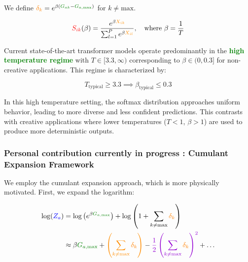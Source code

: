 \documentclass[a4paper]{article}
\theoremstyle{plain}
\theoremstyle{definition}
\theoremstyle{remark}
\begin{document}
We define $\textcolor{orange}{\delta_k} = e^{\beta (\textcolor{greencolor}{G_{ak}} - \textcolor{greencolor}{G_{a, \text{max}}})}$ for $k \neq \text{max}$.

\begin{equation}
\textcolor{red}{S_{ik}}(\beta) = \frac{e^{\beta \textcolor{insightcolor}{X_{ik}}}}{\sum_{l=1}^{P} e^{\beta \textcolor{insightcolor}{X_{il}}}}, \quad \text{where } \beta = \frac{1}{T}
\end{equation}

\begin{tcolorbox}[colback=green!10,colframe=green!80!black,title={\textbf{High Temperature Regime in Production Models}},enhanced,drop shadow,boxrule=2pt]
Current state-of-the-art transformer models operate predominantly in the \textcolor{green}{\textbf{high temperature regime}} with $T \in [3.3, \infty)$ corresponding to $\beta \in (0, 0.3]$ for non-creative applications. This regime is characterized by:

\begin{equation}
\boxed{T_{\text{typical}} \geq 3.3 \implies \beta_{\text{typical}} \leq 0.3}
\end{equation}

In this high temperature setting, the softmax distribution approaches uniform behavior, leading to more diverse and less confident predictions. This contrasts with creative applications where lower temperatures ($T < 1$, $\beta > 1$) are used to produce more deterministic outputs.
\end{tcolorbox}



\subsubsection{Personal contribution currently in progress : Cumulant Expansion Framework}

We employ the cumulant expansion approach, which is more physically motivated. First, we expand the logarithm:

\begin{align}
\log(\textcolor{blue}{Z_a}) &= \log\left(e^{\beta \textcolor{greencolor}{G_{a, \text{max}}}}\right) + \log\left( 1 + \sum_{k \neq \text{max}} \textcolor{orange}{\delta_k} \right) \\
&\approx \beta \textcolor{greencolor}{G_{a, \text{max}}} + \textcolor{insightcolor}{\left(\sum_{k \neq \text{max}} \textcolor{orange}{\delta_k}\right)} - \textcolor{k3color}{\frac{1}{2}\left(\sum_{k \neq \text{max}} \textcolor{orange}{\delta_k}\right)^2} + \dots \label{eq:log_expansion}
\end{align}
\end{document}
